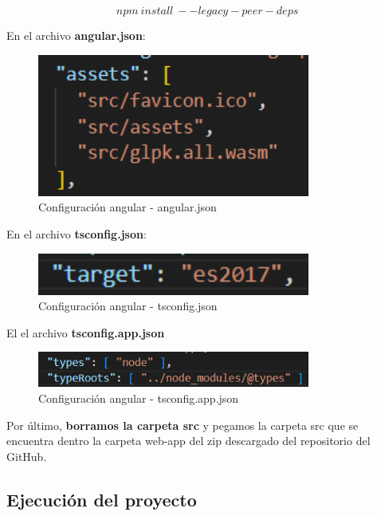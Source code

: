 $$ npm\:install\:--legacy-peer-deps $$

En el archivo \textbf{angular.json}: 

\begin{figure}[h!] 
\centering
    \includegraphics[width=0.8\textwidth]{img/angular_json.PNG}
\caption{Configuración angular - angular.json}
\label{fig:angular_json}
\end{figure}

En el archivo \textbf{tsconfig.json}: 

\begin{figure}[h!] 
\centering
    \includegraphics[width=0.8\textwidth]{img/tsconfig_json.PNG}
\caption{Configuración angular - tsconfig.json}
\label{fig:tsconfig_json}
\end{figure}

\newpage
El el archivo \textbf{tsconfig.app.json}

\begin{figure}[h!] 
\centering
    \includegraphics[width=0.8\textwidth]{img/tsconfig_app_json.PNG}
\caption{Configuración angular - tsconfig.app.json}
\label{fig:tsconfig_app_json}
\end{figure}

Por último, \textbf{borramos la carpeta src} y pegamos la carpeta src  que se encuentra dentro la carpeta web-app del zip descargado del repositorio del GitHub.

\subsection{Ejecución del proyecto}

